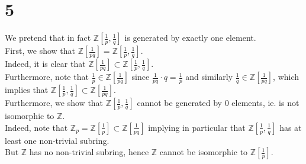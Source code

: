 \documentclass[11pt, a4paper]{article}
\begin{document}
\section*{5}
We pretend that in fact $ \mathbb{Z}\left[ \frac{1}{p}, \frac{1}{q}\right]$ is generated by exactly one element.\\
First, we show that $ \mathbb{Z}[ \frac{1}{pq}]= \mathbb{Z}\left[ \frac{1}{p}, \frac{1}{q}\right]$.\\
Indeed, it is clear that $ \mathbb{Z}[ \frac{1}{pq}] \subset \mathbb{Z} \left[  \frac{1}{p}, \frac{1}{q}\right] $.\\
Furthermore, note that $ \frac{1}{p}\in \mathbb{Z}\left[ \frac{1}{pq}\right] $ since $ \frac{1}{pq}\cdot q = \frac{1}{p}$ and similarly $ \frac{1}{q}\in \mathbb{Z}\left[\frac{1}{pq}\right] $, which implies that $ \mathbb{Z}\left[\frac{1}{p}, \frac{1}{q}\right] \subset \mathbb{Z}\left[\frac{1}{pq}\right]$.\\

Furthermore, we show that $ \mathbb{Z}\left[ \frac{1}{p},\frac{1}{q}\right]$ cannot be generated by 0 elements, ie. is not isomorphic to $\mathbb{Z}$.\\
Indeed, note that $ \mathbb{Z}_p = \mathbb{Z}\left[\frac{1}{p}\right] \subset \mathbb{Z}\left[ \frac{1}{pq}\right]$ implying in particular that $ \mathbb{Z}\left[ \frac{1}{p}, \frac{1}{q}\right] $ has at least one non-trivial subring.\\
But $ \mathbb{Z}$ has no non-trivial subring, hence $ \mathbb{Z}$ cannot be isomorphic to $ \mathbb{Z} \left[  \frac{1}{p}\right] $.
\end{document}

